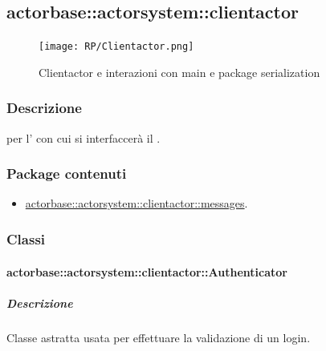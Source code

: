 \documentclass{scalatekids-article}
\begin{document}


\subsection{actorbase::actorsystem::clientactor} %
\label{sec:actorbase::actorsystem::clientactor}

\begin{figure}[H]
  \begin{center}
    \texttt{[image: RP/Clientactor.png]}
    \caption{Clientactor e interazioni con main e package serialization}
  \end{center}
\end{figure}

\subsubsection{Descrizione}

 per l' con cui si interfaccerà il .

\subsubsection{Package contenuti}

\begin{itemize}
\item \hyperref[sec:actorbase::actorsystem::clientactor::messages]{actorbase::actorsystem::clientactor::messages}.
\end{itemize}

\subsubsection{Classi}

\paragraph{actorbase::actorsystem::clientactor::Authenticator}
\label{sec:actorbase::actorsystem::clientactor::Authenticator}

\subparagraph{Descrizione}

Classe astratta usata per effettuare la validazione di un login.
\end{document}
